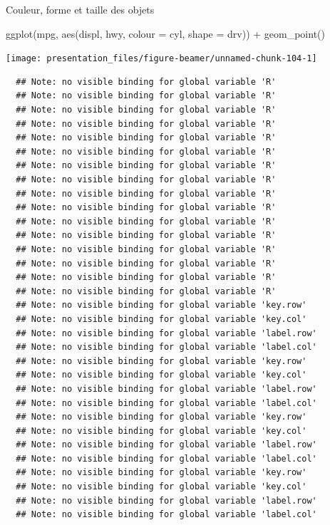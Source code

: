 \documentclass[12pt,ignorenonframetext,handout,]{beamer}
\newenvironment{Shaded}{}{}
\newcommand{\DataTypeTok}[1]{#1}
\newcommand{\KeywordTok}[1]{\textcolor[rgb]{0.00,0.00,1.00}{#1}}
\newcommand{\NormalTok}[1]{#1}
\newcommand{\OperatorTok}[1]{#1}
\newcommand{\StringTok}[1]{\textcolor[rgb]{0.00,0.50,0.50}{#1}}
\renewenvironment{Shaded}{\begin{snugshade}}{\end{snugshade}}
\begin{document}
\begin{frame}[fragile]{Couleur, forme et taille des objets}
\protect\hypertarget{couleur-forme-et-taille-des-objets-4}{}

\footnotesize \center

\begin{Shaded}
\begin{Highlighting}[]
\KeywordTok{ggplot}\NormalTok{(mpg, }\KeywordTok{aes}\NormalTok{(displ, hwy, }\DataTypeTok{colour =}\NormalTok{ cyl, }\DataTypeTok{shape =}\NormalTok{ drv)) }\OperatorTok{+}
\StringTok{  }\KeywordTok{geom_point}\NormalTok{()}
\end{Highlighting}
\end{Shaded}

\texttt{[image: presentation\_files/figure-beamer/unnamed-chunk-104-1]}

\begin{verbatim}
  ## Note: no visible binding for global variable 'R' 
  ## Note: no visible binding for global variable 'R' 
  ## Note: no visible binding for global variable 'R' 
  ## Note: no visible binding for global variable 'R' 
  ## Note: no visible binding for global variable 'R' 
  ## Note: no visible binding for global variable 'R' 
  ## Note: no visible binding for global variable 'R' 
  ## Note: no visible binding for global variable 'R' 
  ## Note: no visible binding for global variable 'R' 
  ## Note: no visible binding for global variable 'R' 
  ## Note: no visible binding for global variable 'R' 
  ## Note: no visible binding for global variable 'R' 
  ## Note: no visible binding for global variable 'R' 
  ## Note: no visible binding for global variable 'R' 
  ## Note: no visible binding for global variable 'R' 
  ## Note: no visible binding for global variable 'R' 
  ## Note: no visible binding for global variable 'key.row' 
  ## Note: no visible binding for global variable 'key.col' 
  ## Note: no visible binding for global variable 'label.row' 
  ## Note: no visible binding for global variable 'label.col' 
  ## Note: no visible binding for global variable 'key.row' 
  ## Note: no visible binding for global variable 'key.col' 
  ## Note: no visible binding for global variable 'label.row' 
  ## Note: no visible binding for global variable 'label.col' 
  ## Note: no visible binding for global variable 'key.row' 
  ## Note: no visible binding for global variable 'key.col' 
  ## Note: no visible binding for global variable 'label.row' 
  ## Note: no visible binding for global variable 'label.col' 
  ## Note: no visible binding for global variable 'key.row' 
  ## Note: no visible binding for global variable 'key.col' 
  ## Note: no visible binding for global variable 'label.row' 
  ## Note: no visible binding for global variable 'label.col'
\end{verbatim}

\end{frame}
\end{document}
